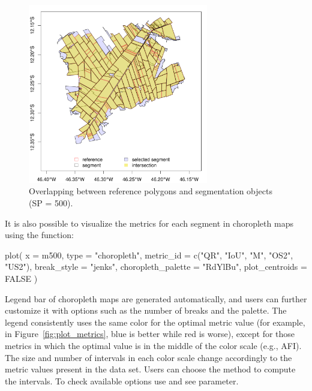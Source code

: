 \begin{figure}[ht]
  \centering
  \includegraphics[width=0.7\textwidth]{fig5.png}
  \caption{Overlapping between reference polygons and segmentation objects (SP = 500).}
  \label{fig:ref_seg}
\end{figure}

It is also possible to visualize the metrics for each segment in choropleth maps using the function:

\begin{example}
plot(
    x = m500,
    type = "choropleth",
    metric_id = c("QR", "IoU", "M", "OS2", "US2"),
    break_style = "jenks",
    choropleth_palette = "RdYlBu",
    plot_centroids = FALSE
)
\end{example}

Legend bar of choropleth maps are generated automatically, and users can further customize it with options such as the number of breaks and the palette.
The legend consistently uses the same color for the optimal metric value (for example, in Figure~\ref{fig:plot_metrics}, blue is better while red is worse), except for those metrics in which the optimal value is in the middle of the color scale (e.g., AFI). 
The size and number of intervals in each color scale change accordingly to the metric values present in the data set. 
Users can choose the method to compute the intervals. 
To check available options use  and see  parameter.

